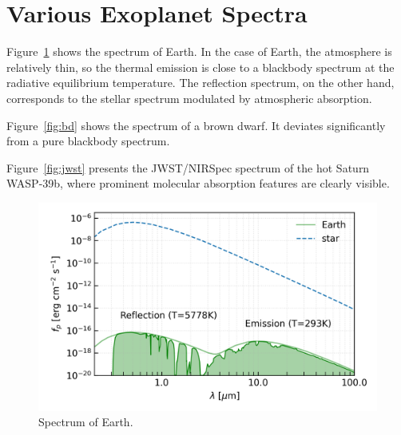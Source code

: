 \section{Various Exoplanet Spectra}

Figure~\ref{fig:earth} shows the spectrum of Earth. In the case of Earth, the atmosphere is relatively thin, so the thermal emission is close to a blackbody spectrum at the radiative equilibrium temperature. The reflection spectrum, on the other hand, corresponds to the stellar spectrum modulated by atmospheric absorption.  

Figure~\ref{fig:bd} shows the spectrum of a brown dwarf. It deviates significantly from a pure blackbody spectrum.  

Figure~\ref{fig:jwst} presents the JWST/NIRSpec spectrum of the hot Saturn WASP-39b, where prominent molecular absorption features are clearly visible.  

\begin{figure}[]
\begin{center}
	\includegraphics[width=\linewidth]{fig/EarthEmis.png}
\end{center}
\caption{Spectrum of Earth.}
\label{fig:earth}
\end{figure}

